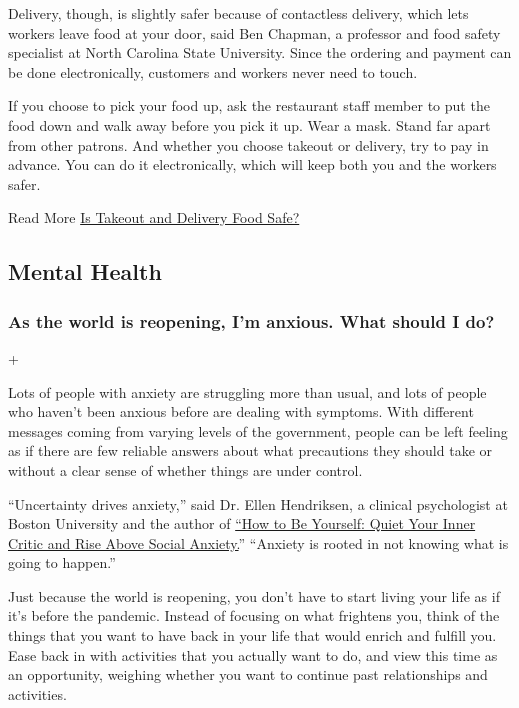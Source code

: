 Delivery, though, is slightly safer because of contactless delivery,
which lets workers leave food at your door, said Ben Chapman, a
professor and food safety specialist at North Carolina State University.
Since the ordering and payment can be done electronically, customers and
workers never need to touch.

If you choose to pick your food up, ask the restaurant staff member to
put the food down and walk away before you pick it up. Wear a mask.
Stand far apart from other patrons. And whether you choose takeout or
delivery, try to pay in advance. You can do it electronically, which
will keep both you and the workers safer.

Read More
\href{https://www.nytimes3xbfgragh.onion/2020/05/27/dining/takeout-delivery-safety-coronavirus.html}{Is
Takeout and Delivery Food Safe?}

\hypertarget{mental-health}{%
\subsection{Mental Health}\label{mental-health}}

\hypertarget{as-the-world-is-reopening-im-anxious-what-should-i-do}{%
\subsubsection{As the world is reopening, I'm anxious. What should I
do?}\label{as-the-world-is-reopening-im-anxious-what-should-i-do}}

+

Lots of people with anxiety are struggling more than usual, and lots of
people who haven't been anxious before are dealing with symptoms. With
different messages coming from varying levels of the government, people
can be left feeling as if there are few reliable answers about what
precautions they should take or without a clear sense of whether things
are under control.

``Uncertainty drives anxiety,'' said Dr. Ellen Hendriksen, a clinical
psychologist at Boston University and the author of
\href{https://us.macmillan.com/books/9781250161703}{``How to Be
Yourself: Quiet Your Inner Critic and Rise Above Social Anxiety.}''
``Anxiety is rooted in not knowing what is going to happen.''

Just because the world is reopening, you don't have to start living your
life as if it's before the pandemic. Instead of focusing on what
frightens you, think of the things that you want to have back in your
life that would enrich and fulfill you. Ease back in with activities
that you actually want to do, and view this time as an opportunity,
weighing whether you want to continue past relationships and activities.

